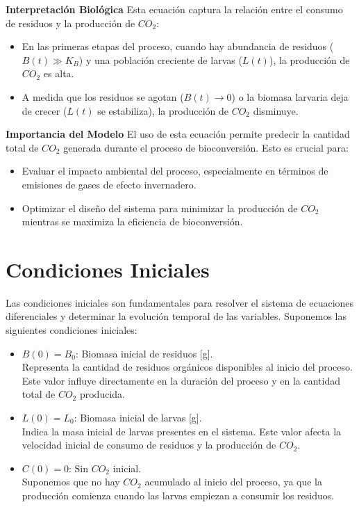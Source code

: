 \documentclass[12pt]{article}
\begin{document}
\textbf{Interpretación Biológica}
Esta ecuación captura la relación entre el consumo de residuos y la producción de $CO_2$:
\begin{itemize}
    \item En las primeras etapas del proceso, cuando hay abundancia de residuos ($B(t) \gg K_B$) y una población creciente de larvas ($L(t)$), la producción de $CO_2$ es alta.
    \item A medida que los residuos se agotan ($B(t) \to 0$) o la biomasa larvaria deja de crecer ($L(t)$ se estabiliza), la producción de $CO_2$ disminuye.
\end{itemize}

\textbf{Importancia del Modelo}
El uso de esta ecuación permite predecir la cantidad total de $CO_2$ generada durante el proceso de bioconversión. Esto es crucial para:
\begin{itemize}
    \item Evaluar el impacto ambiental del proceso, especialmente en términos de emisiones de gases de efecto invernadero.
    \item Optimizar el diseño del sistema para minimizar la producción de $CO_2$ mientras se maximiza la eficiencia de bioconversión.
\end{itemize}

\section{Condiciones Iniciales}

Las condiciones iniciales son fundamentales para resolver el sistema de ecuaciones diferenciales y determinar la evolución temporal de las variables. Suponemos las siguientes condiciones iniciales:

\begin{itemize}
    \item $B(0) = B_0$: Biomasa inicial de residuos [g]. \\
    Representa la cantidad de residuos orgánicos disponibles al inicio del proceso. Este valor influye directamente en la duración del proceso y en la cantidad total de $CO_2$ producida.

    \item $L(0) = L_0$: Biomasa inicial de larvas [g]. \\
    Indica la masa inicial de larvas presentes en el sistema. Este valor afecta la velocidad inicial de consumo de residuos y la producción de $CO_2$.

    \item $C(0) = 0$: Sin $CO_2$ inicial. \\
    Suponemos que no hay $CO_2$ acumulado al inicio del proceso, ya que la producción comienza cuando las larvas empiezan a consumir los residuos.
\end{itemize}
\end{document}
